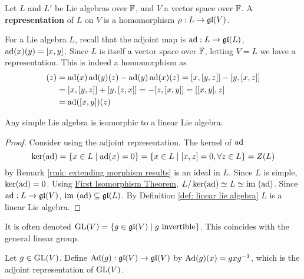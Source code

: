 \documentclass{article}
\begin{document}
\begin{definition}[Representation]
    Let $L$ and $L'$ be Lie algebras over $\mathbb{F}$, and $V$ a vector space over $\mathbb{F}$. A \textbf{representation} of $L$ on $V$ is a homomorphism $\rho: L \to \mathfrak{gl}(V)$.
\end{definition}

\begin{example}
    For a Lie algebra $L$, recall that the adjoint map is $\operatorname{ad}: L \to \mathfrak{gl}(L)$, $\operatorname{ad}(x)(y) = [x, y]$. Since $L$ is itself a vector space over $\mathbb{F}$, letting $V = L$ we have a representation. This is indeed a homomorphism as
    \begin{align*}
        [\ad(x), \ad(y)](z) 
        & = \ad(x) \ad(y)(z) - \ad(y) \ad(x)(z) = [x, [y, z]] - [y, [x, z]] \\
        & = [x, [y, z]] + [y, [z, x]] = -[z, [x, y]] = [[x, y], z] \\
        & = \ad([x, y])(z)
    \end{align*}
\end{example}

\begin{proposition}
    Any simple Lie algebra is isomorphic to a linear Lie algebra.
\end{proposition}

\begin{proof}
    Consider using the adjoint representation. The kernel of $\operatorname{ad}$
    \[
        \ker(\operatorname{ad}) = \{ x \in L \mid \operatorname{ad}(x) = 0 \} = \{ x \in L \mid [x, z] = 0, \forall z \in L \} = Z(L)
    \]
    by Remark \ref{rmk: extending morphism results} is an ideal in $L$. Since $L$ is simple, $\ker(\operatorname{ad}) = 0$. Using \hyperref[rmk: extending morphism results]{First Isomorphism Theorem}, $L/\ker(\operatorname{ad}) \simeq L \simeq \mathrm{im}\ (\operatorname{ad})$. Since $\operatorname{ad}: L \to \mathfrak{gl}(V)$, $\mathrm{im}\ (\operatorname{ad}) \subseteq \mathfrak{gl}(L)$. By Definition \ref{def: linear lie algebra} $L$ is a linear Lie algebra.
\end{proof}

\begin{notation}
    It is often denoted $\mathrm{GL}(V) = \{ g \in \mathfrak{gl}(V) \mid g \text{ invertible} \}$. This coincides with the general linear group.
\end{notation}
\nogap
\begin{example}
    Let $g \in \mathrm{GL}(V)$. Define $\operatorname{Ad}(g): \mathfrak{gl}(V) \to \mathfrak{gl}(V)$ by $\operatorname{Ad}(g)(x) = gxg^{-1}$, which is the adjoint representation of $\mathrm{GL}(V)$.
\end{example}
\end{document}
